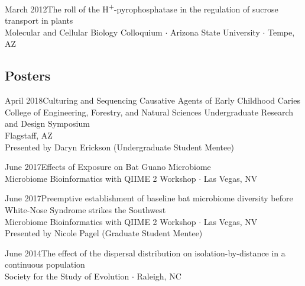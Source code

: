 \documentclass[]{cv-style}          %
\begin{document}
\begin{entrylist}
\entry
{March 2012}{\normalfont The roll of the H\textsuperscript{+}-pyrophosphatase in the regulation of sucrose transport in plants}{\\Molecular and Cellular Biology Colloquium $\cdot$ Arizona State University $\cdot$ Tempe, AZ}
{\vspace{-0.3cm}}
\end{entrylist}

\subsection{Posters}
\begin{entrylist}
\entry
{April 2018}{\normalfont Culturing and Sequencing Causative Agents of Early Childhood Caries}{\\College of Engineering, Forestry, and Natural Sciences Undergraduate Research and Design Symposium \\Flagstaff, AZ\\
Presented by Daryn Erickson (Undergraduate Student Mentee)}
{\vspace{-0.3cm}}
\end{entrylist}

\begin{entrylist}
\entry
{June 2017}{\normalfont Effects of Exposure on Bat Guano Microbiome}{\\Microbiome Bioinformatics with QIIME 2 Workshop $\cdot$ Las Vegas, NV}
{\vspace{-0.3cm}}
\end{entrylist}

\begin{entrylist}
\entry
{June 2017}{\normalfont Preemptive establishment of baseline bat microbiome diversity before White-Nose Syndrome strikes the Southwest}{\\Microbiome Bioinformatics with QIIME 2 Workshop $\cdot$ Las Vegas, NV\\Presented by Nicole Pagel (Graduate Student Mentee)}
{\vspace{-0.3cm}}
\end{entrylist}

\begin{entrylist}
\entry
{June 2014}{\normalfont The effect of the dispersal distribution on isolation-by-distance in a continuous population}{\\Society for the Study of Evolution $\cdotp$ Raleigh, NC}
{\vspace{-0.3cm}}
\end{entrylist}
\end{document}
